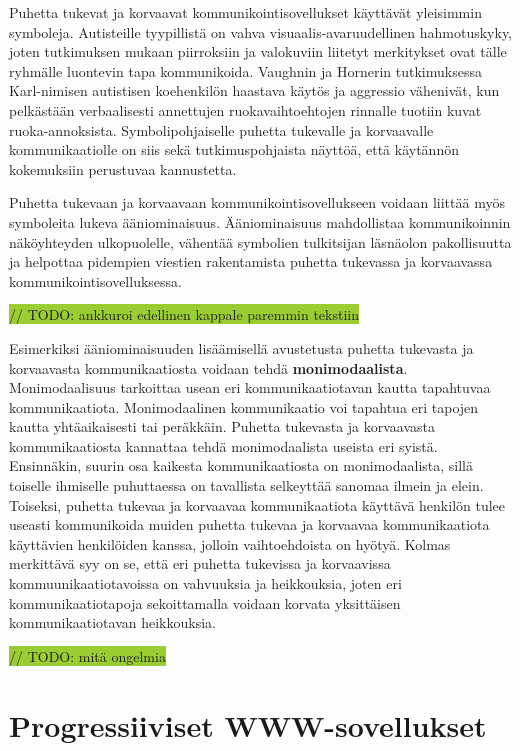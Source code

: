 \documentclass[utf8]{gradu3}
\begin{document}
Puhetta tukevat ja korvaavat kommunikointisovellukset käyttävät yleisimmin symboleja. Autisteille tyypillistä on vahva visuaalis-avaruudellinen hahmotuskyky, joten tutkimuksen mukaan piirroksiin ja valokuviin liitetyt merkitykset ovat tälle ryhmälle luontevin tapa kommunikoida. Vaughnin ja Hornerin tutkimuksessa  \parencite[]{concrete-versus-verbal} Karl-nimisen autistisen koehenkilön haastava käytös ja aggressio vähenivät, kun pelkästään verbaalisesti annettujen ruokavaihtoehtojen rinnalle tuotiin kuvat ruoka-annoksista. Symbolipohjaiselle puhetta tukevalle ja korvaavalle kommunikaatiolle on siis sekä tutkimuspohjaista näyttöä, että käytännön kokemuksiin perustuvaa kannustetta.

Puhetta tukevaan ja korvaavaan kommunikointisovellukseen voidaan liittää myös symboleita lukeva ääniominaisuus. Ääniominaisuus mahdollistaa kommunikoinnin näköyhteyden ulkopuolelle, vähentää symbolien tulkitsijan läsnäolon pakollisuutta ja helpottaa pidempien viestien rakentamista puhetta tukevassa ja korvaavassa kommunikointisovelluksessa. \parencite[]{AAC-interventions}

\colorbox{YellowGreen}{// TODO: ankkuroi edellinen kappale paremmin tekstiin}

Esimerkiksi ääniominaisuuden lisäämisellä avustetusta puhetta tukevasta ja korvaavasta kommunikaatiosta voidaan tehdä \textbf{monimodaalista}. Monimodaalisuus tarkoittaa usean eri kommunikaatiotavan kautta tapahtuvaa kommunikaatiota. Monimodaalinen kommunikaatio voi tapahtua eri tapojen kautta yhtäaikaisesti tai peräkkäin. Puhetta tukevasta ja korvaavasta kommunikaatiosta kannattaa tehdä monimodaalista useista eri syistä. Ensinnäkin, suurin osa kaikesta kommunikaatiosta on monimodaalista, sillä toiselle ihmiselle puhuttaessa on tavallista selkeyttää sanomaa ilmein ja elein. Toiseksi, puhetta tukevaa ja korvaavaa kommunikaatiota käyttävä henkilön tulee useasti kommunikoida muiden puhetta tukevaa ja korvaavaa kommunikaatiota käyttävien henkilöiden kanssa, jolloin vaihtoehdoista on hyötyä. Kolmas merkittävä syy on se, että eri puhetta tukevissa ja korvaavissa kommuunikaatiotavoissa on vahvuuksia ja heikkouksia, joten eri kommunikaatiotapoja sekoittamalla voidaan korvata yksittäisen kommunikaatiotavan heikkouksia. \parencite[]{AAC-conditional-use}

\colorbox{YellowGreen}{// TODO: mitä ongelmia} 

\section{Progressiiviset WWW-sovellukset}
\end{document}
